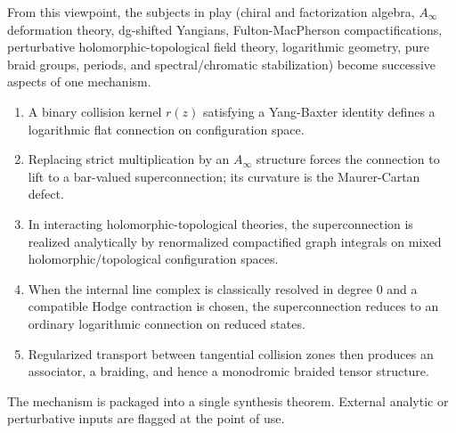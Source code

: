 From this viewpoint, the subjects in play (chiral and factorization algebra, $A_\infty$ deformation theory, dg-shifted Yangians, Fulton-MacPherson compactifications, perturbative holomorphic-topological field theory, logarithmic geometry, pure braid groups, periods, and spectral/chromatic stabilization) become successive aspects of one mechanism.
\begin{enumerate}[label=\textup{(\arabic*)}]
 \item A binary collision kernel $r(z)$ satisfying a Yang-Baxter identity defines a logarithmic flat connection on configuration space.
 \item Replacing strict multiplication by an $A_\infty$ structure forces the connection to lift to a bar-valued superconnection; its curvature is the Maurer-Cartan defect.
 \item In interacting holomorphic-topological theories, the superconnection is realized analytically by renormalized compactified graph integrals on mixed holomorphic/topological configuration spaces.
 \item When the internal line complex is classically resolved in degree $0$ and a compatible Hodge contraction is chosen, the superconnection reduces to an ordinary logarithmic connection on reduced states.
 \item Regularized transport between tangential collision zones then produces an associator, a braiding, and hence a monodromic braided tensor structure.
\end{enumerate}

The mechanism is packaged into a single synthesis theorem. External analytic or perturbative inputs are flagged at the point of use.

